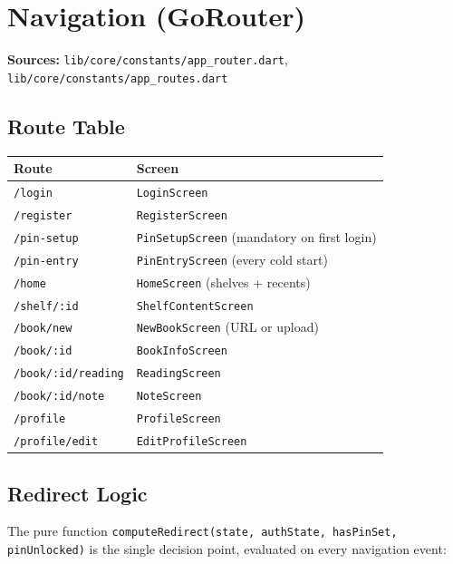 \documentclass[11pt,a4paper]{article}
\begin{document}
\section{Navigation (GoRouter)}

\textbf{Sources:} \texttt{lib/core/constants/app\_router.dart},
\texttt{lib/core/constants/app\_routes.dart}

\subsection{Route Table}

\vspace{4pt}
\begin{tabularx}{\textwidth}{@{}L{4.8cm} L{8.8cm}@{}}
  \toprule
  \textbf{Route} & \textbf{Screen} \\
  \midrule
  \texttt{/login} & \texttt{LoginScreen} \\
  \texttt{/register} & \texttt{RegisterScreen} \\
  \texttt{/pin-setup} & \texttt{PinSetupScreen} (mandatory on first login) \\
  \texttt{/pin-entry} & \texttt{PinEntryScreen} (every cold start) \\
  \texttt{/home} & \texttt{HomeScreen} (shelves + recents) \\
  \texttt{/shelf/:id} & \texttt{ShelfContentScreen} \\
  \texttt{/book/new} & \texttt{NewBookScreen} (URL or upload) \\
  \texttt{/book/:id} & \texttt{BookInfoScreen} \\
  \texttt{/book/:id/reading} & \texttt{ReadingScreen} \\
  \texttt{/book/:id/note} & \texttt{NoteScreen} \\
  \texttt{/profile} & \texttt{ProfileScreen} \\
  \texttt{/profile/edit} & \texttt{EditProfileScreen} \\
  \bottomrule
\end{tabularx}

\subsection{Redirect Logic}

The pure function \texttt{computeRedirect(state, authState, hasPinSet, pinUnlocked)}
is the single decision point, evaluated on every navigation event:
\end{document}
